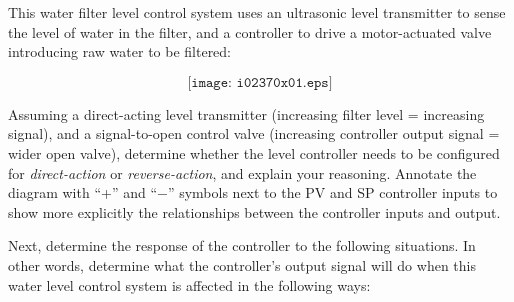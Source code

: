 

This water filter level control system uses an ultrasonic level transmitter to sense the level of water in the filter, and a controller to drive a motor-actuated valve introducing raw water to be filtered:

$$\texttt{[image: i02370x01.eps]}$$

Assuming a direct-acting level transmitter (increasing filter level = increasing signal), and a signal-to-open control valve (increasing controller output signal = wider open valve), determine whether the level controller needs to be configured for {\it direct-action} or {\it reverse-action}, and explain your reasoning.  Annotate the diagram with ``+'' and ``$-$'' symbols next to the PV and SP controller inputs to show more explicitly the relationships between the controller inputs and output.

\vskip 10pt

Next, determine the response of the controller to the following situations.  In other words, determine what the controller's output signal will do when this water level control system is affected in the following ways:

